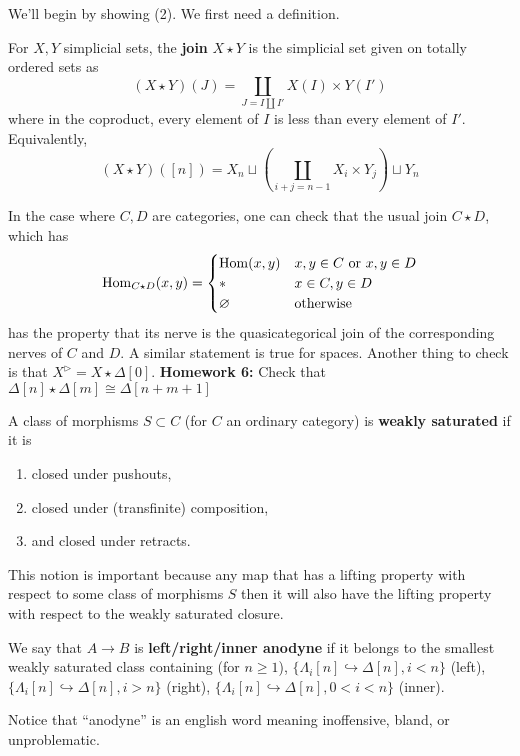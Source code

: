 \documentclass{amsart}
\begin{document}
We'll begin by showing (2). We first need a definition.
\begin{definition}
    For $X,Y$ simplicial sets, the \textbf{join} $X\star Y$ is the simplicial set given on
    totally ordered sets as
    \begin{equation*}
        (X\star Y)(J) = \coprod_{J=I\coprod I'} X(I)\times Y(I')
    \end{equation*}
    where in the coproduct, every element of $I$ is less than every element of $I'$.
    Equivalently,
    \begin{equation*}
        (X\star Y)([n]) = X_n \sqcup \left( \coprod_{i+j=n-1}X_i\times Y_j \right)\sqcup Y_n
    \end{equation*}
\end{definition}
In the case where $C, D$ are categories, one can check that
the usual join $C\star D$, which has
\begin{equation*}
    \operatorname{Hom}_{C\star D}(x,y) =
    \begin{cases}
        \operatorname{Hom}(x,y) & x,y\in C\text{ or }x,y\in D \\
        * & x\in C, y\in D \\
        \varnothing & \text{otherwise}
    \end{cases}
\end{equation*}
has the property that its nerve is the quasicategorical join of the corresponding
nerves of $C$ and $D$. A similar statement is true for spaces.
Another thing to check is that $X^\triangleright=X\star \Delta[0]$.
\textbf{Homework 6:} Check that $\Delta[n]\star\Delta[m]\cong \Delta[n+m+1]$
\begin{definition}
    A class of morphisms $S\subset C$ (for $C$ an ordinary category) is \textbf{weakly saturated}
    if it is
    \begin{enumerate}
        \item closed under pushouts,
        \item closed under (transfinite) composition,
        \item and closed under retracts.
    \end{enumerate}
\end{definition}
This notion is important because any map that has a lifting property with respect
to some class of morphisms $S$ then it will also have the lifting property with respect to 
the weakly saturated closure. 

\begin{definition}
    We say that $A\to B$ is \textbf{left/right/inner anodyne} if it belongs to
    the smallest weakly saturated class containing (for $n\geq 1$),
    $\{\Lambda_i[n]\hookrightarrow \Delta[n], i<n\}$ (left),
    $\{\Lambda_i[n]\hookrightarrow \Delta[n], i>n\}$ (right),
    $\{\Lambda_i[n]\hookrightarrow \Delta[n], 0<i<n\}$ (inner).
\end{definition}
Notice that ``anodyne'' is an english word meaning inoffensive, bland,
or unproblematic.
\end{document}
